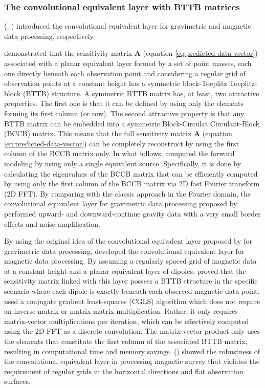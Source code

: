   
\subsubsection{The convolutional equivalent layer with BTTB matrices}

\citeauthor{takahashi2020} (\citeyear{takahashi2020}, 
\citeyear{takahashi2022}) introduced the convolutional equivalent layer for gravimetric and magnetic data processing, respectively.


\cite{takahashi2020} demonstrated that the sensitivity matrix $\mathbf{A}$ (equation \ref{eq:predicted-data-vector}) associated with a planar equivalent layer formed by a set of point masses, each one directly beneath each observation point and considering a regular grid of observation points at a constant height has a symmetric block-Toeplitz Toeplitz-block (BTTB) structure.
A symmetric BTTB matrix has, at least, two attractive properties.
The first one is that it can be defined by using only
the elements forming its first column (or row).
The second attractive property is that any BTTB matrix can be
embedded into a symmetric Block-Circulat Circulant-Block (BCCB) matrix.
This means that the  full sensitivity matrix 
$\mathbf{A}$ (equation \ref{eq:predicted-data-vector})  can be 
completely reconstruct by using the first column of the BCCB matrix only.
In what follows, \cite{takahashi2020} computed the forward modeling 
by using only a single equivalent source. 
Specifically, it is done by calculating  the eigenvalues of the BCCB matrix
that can be efficiently computed by using only the first column of the BCCB matrix via 2D fast Fourier transform (2D FFT).
By comparing with the classic approach in the Fourier domain, 
the convolutional equivalent layer for gravimetric data processing 
proposed by \cite{takahashi2020} performed upward- and downward-continue gravity data with a very small border effects and noise amplification.

By using the original idea of the convolutional equivalent layer 
proposed by \cite{takahashi2020} for gravimetric data processing, \cite{takahashi2022}  developed the convolutional equivalent layer for magnetic data processing.
By assuming a regularly spaced grid of magnetic data  at a constant height 
and a planar equivalent layer of dipoles, \cite{takahashi2022} proved that the sensitivity matrix linked with this layer possess a BTTB structure in the specific scenario where each dipole is exactly beneath each observed magnetic data point. 
\cite{takahashi2022} used a conjugate gradient least-squares (CGLS) algorithm  which 
does not require an inverse matrix or matrix-matrix multiplication. 
Rather, it only requires matrix-vector multiplications per iteration, 
which can be effectively computed using the 2D FFT as a discrete convolution.
The matrix-vector product only uses the elements that constitute the first column of the associated BTTB matrix, resulting in computational time and memory savings.
\citeauthor{takahashi2022} (\citeyear{takahashi2022}) showed the robustness of
the convolutional equivalent layer  in processing magnetic survey that  
violates the requirement of regular grids in the horizontal directions
and flat observation surfaces.

